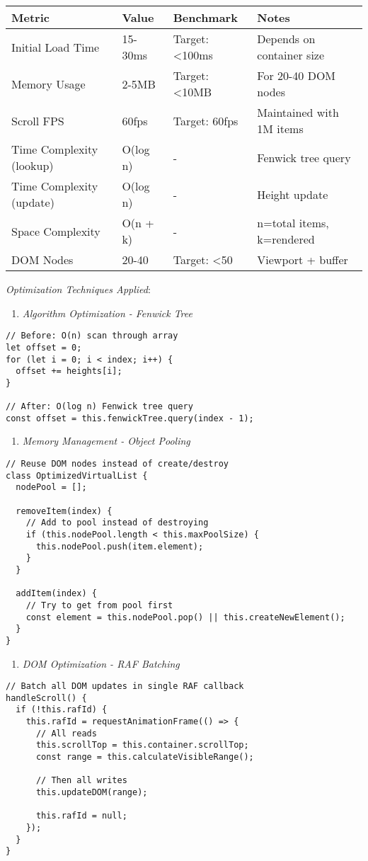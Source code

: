 \documentclass[11pt]{article}
\begin{document}
\begin{center}
\begin{tabular}{llll}
Metric & Value & Benchmark & Notes\\
\hline
Initial Load Time & 15-30ms & Target: <100ms & Depends on container size\\
Memory Usage & 2-5MB & Target: <10MB & For 20-40 DOM nodes\\
Scroll FPS & 60fps & Target: 60fps & Maintained with 1M items\\
Time Complexity (lookup) & O(log n) & - & Fenwick tree query\\
Time Complexity (update) & O(log n) & - & Height update\\
Space Complexity & O(n + k) & - & n=total items, k=rendered\\
DOM Nodes & 20-40 & Target: <50 & Viewport + buffer\\
\end{tabular}
\end{center}

\emph{Optimization Techniques Applied}:

\begin{enumerate}
\item \emph{Algorithm Optimization - Fenwick Tree}
\end{enumerate}
\begin{verbatim}
// Before: O(n) scan through array
let offset = 0;
for (let i = 0; i < index; i++) {
  offset += heights[i];
}

// After: O(log n) Fenwick tree query
const offset = this.fenwickTree.query(index - 1);
\end{verbatim}

\begin{enumerate}
\item \emph{Memory Management - Object Pooling}
\end{enumerate}
\begin{verbatim}
// Reuse DOM nodes instead of create/destroy
class OptimizedVirtualList {
  nodePool = [];
  
  removeItem(index) {
    // Add to pool instead of destroying
    if (this.nodePool.length < this.maxPoolSize) {
      this.nodePool.push(item.element);
    }
  }
  
  addItem(index) {
    // Try to get from pool first
    const element = this.nodePool.pop() || this.createNewElement();
  }
}
\end{verbatim}

\begin{enumerate}
\item \emph{DOM Optimization - RAF Batching}
\end{enumerate}
\begin{verbatim}
// Batch all DOM updates in single RAF callback
handleScroll() {
  if (!this.rafId) {
    this.rafId = requestAnimationFrame(() => {
      // All reads
      this.scrollTop = this.container.scrollTop;
      const range = this.calculateVisibleRange();
      
      // Then all writes
      this.updateDOM(range);
      
      this.rafId = null;
    });
  }
}
\end{verbatim}
\end{document}
